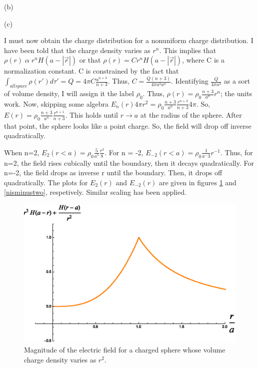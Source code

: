 \begin{homeworkProblem}
\begin{homeworkSection}{(b)}
\end{homeworkSection}

\begin{homeworkSection}{(c)}

I must now obtain the charge distribution for a nonuniform charge distribution. I have been told that the charge density varies as $r^n$. This implies that $\rho(r)\; \alpha \; r^n H(a-|\vec{r}|)$ or that $\rho(r) = C r^n H(a-|\vec{r}|)$, where C is a normalization constant. C is constrained by the fact that $\int_{all space} \rho(r')d\tau' = Q = 4\pi C \frac{a^{n+3}}{n+3}$. Thus, $C = \frac{Q (n+3)}{4\pi a^3 a^n}$. Identifying $\frac{Q}{4\pi a^3}$ as a sort of volume density, I will assign it the label $\rho_0$. Thus, $\rho(r) = \rho_0 \frac{n+3}{a^n} r^n$; the units work. Now, skipping some algebra $E_n(r) 4\pi r^2 = \rho_0 \frac{n+3}{a^n} \frac{r^{n+3}}{n+3} 4\pi$. So, $E(r) = \rho_0 \frac{n+3}{a^n} \frac{r^{n+1}}{n+3}$. This holds until $r \rightarrow a$ at the radius of the sphere. After that point, the sphere looks like a point charge. So, the field will drop off inverse quadratically.
\\ \par
When n=2, $E_2(r<a) =  \rho_0 \frac{5}{a^5} \frac{r^{3}}{8}$. For n = -2, $E_{-2}(r<a)=\rho_0 \frac{1}{a^-3} r^{-1}$. Thus, for n=2, the field rises cubically until the boundary, then it decays quadratically. For n=-2, the field drops as inverse r until the boundary. Then, it drops off quadratically. The plots for $E_2(r)$ and $E_{-2}(r)$ are given in figures \ref{nistwo} and \ref{nisminustwo}, respetively. Similar scaling has been applied.


\begin{figure}%
\centerline{\includegraphics[width=.65\columnwidth,height=.25\paperheight]{./Images/nsphereequalstwo.eps}}%
\caption{Magnitude of the electric field for a charged sphere whose volume charge density varies as $r^2$.}%
\label{nistwo}%
\end{figure}



\end{homeworkSection}
\end{homeworkProblem}
